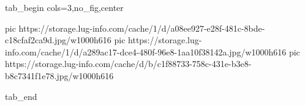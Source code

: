  
 
 
 
 


\ifcmt
  tab_begin cols=3,no_fig,center

     pic https://storage.lug-info.com/cache/1/d/a08ee927-e28f-481c-8bde-c18cfaf2ca9d.jpg/w1000h616%
     pic https://storage.lug-info.com/cache/1/d/a289ac17-dce4-480f-96e8-1aa10f38142a.jpg/w1000h616%
     pic https://storage.lug-info.com/cache/d/b/c1f88733-758c-431e-b3e8-b8c7341f1e78.jpg/w1000h616%

  tab_end
\fi
